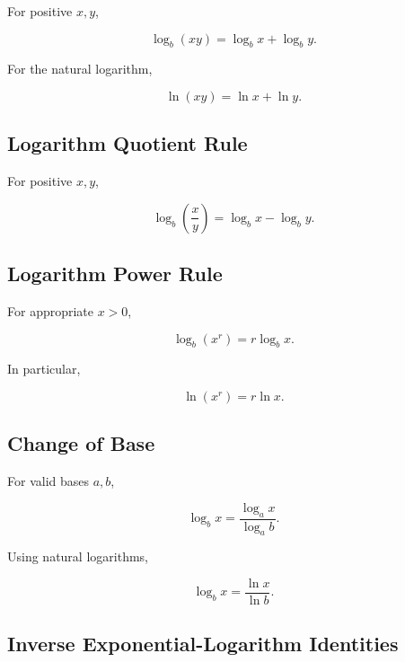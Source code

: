 For positive \(x,y\),

\[
\boxed{
\log_b(xy)
=
\log_bx+\log_by.
}
\]

For the natural logarithm,

\[
\boxed{
\ln(xy)
=
\ln x+\ln y.
}
\]

\subsection{Logarithm Quotient Rule}
\label{subsec:logarithm-quotient-rule}

For positive \(x,y\),

\[
\boxed{
\log_b
\left(
\frac{x}{y}
\right)
=
\log_bx-\log_by.
}
\]

\subsection{Logarithm Power Rule}
\label{subsec:logarithm-power-rule}

For appropriate \(x>0\),

\[
\boxed{
\log_b(x^r)
=
r\log_bx.
}
\]

In particular,

\[
\boxed{
\ln(x^r)
=
r\ln x.
}
\]

\subsection{Change of Base}
\label{subsec:change-of-base-reference}

For valid bases \(a,b\),

\[
\boxed{
\log_bx
=
\frac{\log_ax}{\log_ab}.
}
\]

Using natural logarithms,

\[
\boxed{
\log_bx
=
\frac{\ln x}{\ln b}.
}
\]

\subsection{Inverse Exponential-Logarithm Identities}
\label{subsec:inverse-log-exp-identities}

